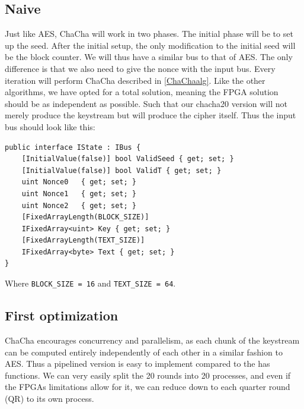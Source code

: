 \documentclass[a4paper, openany]{book}
\begin{document}
\subsection{Naive}
\label{ChaChaNaive}
Just like AES, ChaCha will work in two phases. The initial phase will be to set up the seed. After the initial setup, the only modification to the initial seed will be the block counter. We will thus have a similar bus to that of AES. The only difference is that we also need to give the nonce with the input bus. Every iteration will perform ChaCha described in \ref{ChaChaalg}. Like the other algorithms, we have opted for a total solution, meaning the FPGA solution should be as independent as possible. Such that our chacha20 version will not merely produce the keystream but will produce the cipher itself. Thus the input bus should look like this:
\begin{Verbatim}[fontsize=\footnotesize]
public interface IState : IBus {
    [InitialValue(false)] bool ValidSeed { get; set; }
    [InitialValue(false)] bool ValidT { get; set; }
    uint Nonce0   { get; set; }
    uint Nonce1   { get; set; }
    uint Nonce2   { get; set; }
    [FixedArrayLength(BLOCK_SIZE)]
    IFixedArray<uint> Key { get; set; }
    [FixedArrayLength(TEXT_SIZE)]
    IFixedArray<byte> Text { get; set; }
}
\end{Verbatim}
Where \texttt{BLOCK\_SIZE = 16} and \texttt{TEXT\_SIZE = 64}.
\subsection{First optimization}
\label{ChaCha1}
ChaCha encourages concurrency and parallelism, as each chunk of the keystream can be computed entirely independently of each other in a similar fashion to AES. Thus a pipelined version is easy to implement compared to the has functions. We can very easily split the 20 rounds into 20 processes, and even if the FPGAs limitations allow for it, we can reduce down to each quarter round (QR) to its own process.
\end{document}
